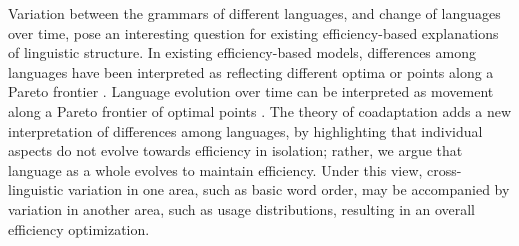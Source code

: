\documentclass[11pt,a4paper]{article}
\begin{document}













Variation between the grammars of different languages, and change of languages over time, pose an interesting question for existing efficiency-based explanations of linguistic structure.
In existing efficiency-based models, differences among languages have been interpreted as reflecting different optima or points along a Pareto frontier \citep{zaslavsky2018efficient, hahn2020universals}.
Language evolution over time can be interpreted as movement along a Pareto frontier of optimal points \citep{zaslavsky2019evolution}.
The theory of coadaptation adds a new interpretation of differences among languages, by highlighting that individual aspects do not evolve towards efficiency in isolation; rather, we argue that language as a whole evolves to maintain efficiency.
Under this view, cross-linguistic variation in one area, such as basic word order, may be accompanied by variation in another area, such as usage distributions, resulting in an overall efficiency optimization.
\end{document}
